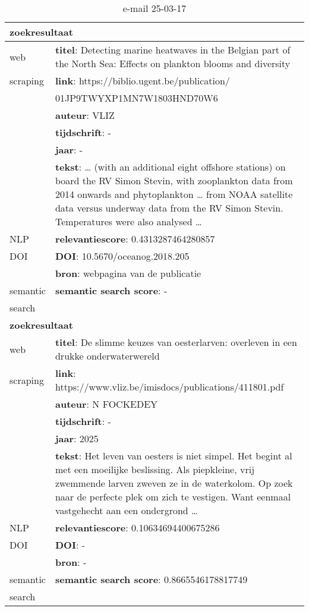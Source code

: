 \begin{table}[h!]
    \caption{e-mail 25-03-17}
    \centering
    \begin{tabularx}{\textwidth}{|p{4cm}|X|} 
        \hline
        \multicolumn{2}{|X|}{\textbf{zoekresultaat}} \\
        \hline
        web &\textbf{titel}: Detecting marine heatwaves in the Belgian part of the North Sea: Effects on plankton blooms and diversity\\
        scraping&\textbf{link}: https://biblio.ugent.be/publication/\\&01JP9TWYXP1MN7W1803HND70W6\\
        &\textbf{auteur}: VLIZ\\
        &\textbf{tijdschrift}: -\\
        &\textbf{jaar}: -\\
        &\textbf{tekst}: … (with an additional eight offshore stations) on board the RV Simon Stevin, with zooplankton data from 2014 onwards and phytoplankton … from NOAA satellite data versus underway data from the RV Simon Stevin. Temperatures were also analysed …\\
        \hline
        NLP&\textbf{relevantiescore}: 0.4313287464280857\\
        \hline
        DOI&\textbf{DOI}: 10.5670/oceanog.2018.205\\
        &\textbf{bron}: webpagina van de publicatie\\
        \hline
        semantic&\textbf{semantic search score}: -\\
        search&\\
        \hline
        \multicolumn{2}{|X|}{\textbf{zoekresultaat}} \\
        \hline
        web &\textbf{titel}: De slimme keuzes van oesterlarven: overleven in een drukke onderwaterwereld\\
        scraping&\textbf{link}: https://www.vliz.be/imisdocs/publications/411801.pdf\\
        &\textbf{auteur}: N FOCKEDEY\\
        &\textbf{tijdschrift}: -\\
        &\textbf{jaar}: 2025\\
        &\textbf{tekst}: Het leven van oesters is niet simpel. Het begint al met een moeilijke beslissing. Als piepkleine, vrij zwemmende larven zweven ze in de waterkolom. Op zoek naar de perfecte plek om zich te vestigen. Want eenmaal vastgehecht aan een ondergrond …\\
        \hline
        NLP&\textbf{relevantiescore}: 0.10634694400675286\\
        \hline
        DOI&\textbf{DOI}: -\\
        &\textbf{bron}: -\\
        \hline
        semantic&\textbf{semantic search score}: 0.8665546178817749\\
        search&\\
        \hline
    \end{tabularx}
    \label{table:email20250317}
\end{table}
